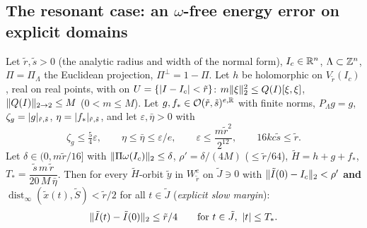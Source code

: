 \subsection{The resonant case: an $\omega$-free energy error on explicit domains}\label{bpN:p11:s-energy}

\begin{lemma}\label{bpN:p11:energy-free}
Let $\tilde r,\tilde s>0$ (the analytic radius and width of the normal form), $I_c\in\mathbb{R}^n$, $\Lambda\subset\mathbb{Z}^n$, $\Pi=\Pi_\Lambda$ the Euclidean projection, $\Pi^\perp=1-\Pi$. Let $h$ be holomorphic on $V_{\tilde r}(I_c)$, real on real points, with on $U=\{\lvert I-I_c\rvert<\tilde r\}$: $m\lVert \xi\rVert_2^2\le Q(I)[\xi,\xi]$, $\lVert Q(I)\rVert_{2\to2}\le M$ ($0<m\le M$). Let $g,f_*\in\mathcal O(\tilde r,\tilde s)^{e,\mathbb{R}}$ with finite norms, $P_\Lambda g=g$, $\zeta_g=\lvert g\rvert_{\tilde r,\tilde s}$, $\eta=\lvert f_*\rvert_{\tilde r,\tilde s}$, and let $\varepsilon,\bar\eta>0$ with
\[\zeta_g\le\tfrac54\varepsilon,\qquad\eta\le\bar\eta\le\varepsilon/e,\qquad\varepsilon\le\frac{m\tilde r^2}{2^{12}},\qquad16kc\tilde s\le\tilde r .\]
Let $\delta\in(0,m\tilde r/16]$ with $\lVert \Pi\omega(I_c)\rVert_2\le\delta$, $\rho'=\delta/(4M)$ ($\le\tilde r/64$), $\tilde H=h+g+f_*$, $T_*=\dfrac{\tilde s\,m\,\tilde r}{20\,M\,\bar\eta}$. Then for every $\tilde H$-orbit $\tilde y$ in $W^e_{\tilde r}$ on $\tilde J\ni0$ with $\lVert \tilde I(0)-I_c\rVert_2<\rho'$ \textbf{and} $\operatorname{dist}_\infty(\tilde x(t),\tilde S)<\tilde r/2$ for all $t\in\tilde J$ (\emph{explicit slow margin}):
\[\lVert \tilde I(t)-\tilde I(0)\rVert_2\le\tilde r/4\qquad\text{for }t\in\tilde J,\ \lvert t\rvert\le T_* .\]
\end{lemma}
